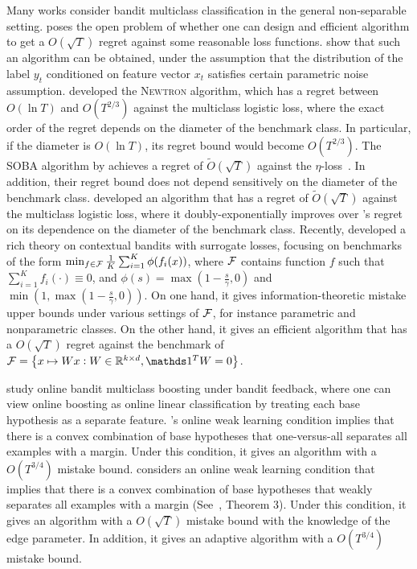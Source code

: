 Many works consider bandit multiclass classification in the general
non-separable setting. \cite{Abernethy-Rakhlin-2009} poses the open problem of
whether one can design and efficient algorithm to get a $O(\sqrt{T})$ regret
against some reasonable loss functions. \cite{Crammer-Gentile-2013} show that
such an algorithm can be obtained, under the assumption that the distribution of
the label $y_t$ conditioned on feature vector $x_t$ satisfies certain parametric
noise assumption. \cite{Hazan-Kale-2011} developed the \textsc{Newtron}
algorithm, which has a regret between $O(\ln T)$ and $O(T^{2/3})$ against the
multiclass logistic loss, where the exact order of the regret depends on the
diameter of the benchmark class. In particular, if the diameter is $O(\ln T)$,
its regret bound would become $O(T^{2/3})$. The SOBA algorithm by
\cite{Beygelzimer-Orabona-Zhang-2017} achieves a regret of
$\widetilde{O}(\sqrt{T})$ against the
$\eta$-loss~\cite{Orabona-Cesa-Bianchi-Gentile-2012}. In addition, their regret
bound does not depend sensitively on the diameter of the benchmark class.
\cite{Foster-Kale-Luo-Mohri-Sridharan-2018} developed an algorithm that has a
regret of $\widetilde{O}(\sqrt{T})$ against the multiclass logistic loss, where
it doubly-exponentially improves over \cite{Hazan-Kale-2011}'s regret on its
dependence on the diameter of the benchmark class. Recently,
\cite{Foster-Krishnamurthy-2018} developed a rich theory on contextual bandits
with surrogate losses, focusing on benchmarks of the form $\min_{f \in \mathcal{F}}
\frac{1}{K} \sum_{i=1}^K \phi( f_i(x) )$, where $\mathcal{F}$ contains function $f$
such that $\sum_{i=1}^K f_i(\cdot) \equiv 0$, and $\phi(s) = \max(1 - \frac s
\gamma, 0)$ and $\min(1, \max(1 - \frac s \gamma, 0))$. On one hand, it gives
information-theoretic mistake upper bounds under various settings of $\mathcal{F}$,
for instance parametric and nonparametric classes. On the other hand, it gives
an efficient algorithm that has a $O(\sqrt{T})$ regret against the benchmark of
$\calF = \cbr{x \mapsto W x: W \in \R^{k \times d}, \one^T W = 0}$.

\cite{Chen-Lin-Lu-2014, Zhang-Jung-Tewari-2018} study online bandit multiclass
boosting under bandit feedback, where one can view online boosting as online
linear classification by treating each base hypothesis as a separate feature.
\cite{Chen-Lin-Lu-2014}'s online weak learning condition implies that there is a
convex combination of base hypotheses that one-versus-all separates all examples
with a margin. Under this condition, it gives an algorithm with a $O(T^{3/4})$
mistake bound. \cite{Zhang-Jung-Tewari-2018} considers an online weak learning
condition that implies that there is a convex combination of base hypotheses
that weakly separates all examples with a margin
(See~\cite{Mukherjee-Schapire-2013}, Theorem 3). Under this condition, it gives
an algorithm with a $O(\sqrt{T})$ mistake bound with the knowledge of the edge
parameter. In addition, it gives an adaptive algorithm with a $O(T^{3/4})$
mistake bound.

